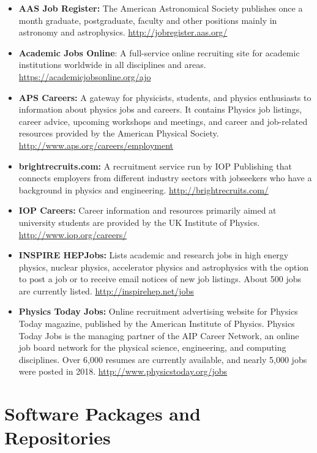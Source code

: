 \begin{itemize}
\item
  \textbf{AAS Job Register:} The American Astronomical Society publishes
  once a month graduate, postgraduate, faculty and other positions
  mainly in astronomy and astrophysics.
  \url{http://jobregister.aas.org/}
\item
  \textbf{Academic Jobs Online}: A full-service online recruiting site
  for academic institutions worldwide in all disciplines and areas.
  \url{https://academicjobsonline.org/ajo}
\item
  \textbf{APS Careers:} A gateway for physicists, students, and physics
  enthusiasts to information about physics jobs and careers. It contains
  Physics job listings, career advice, upcoming workshops and meetings,
  and career and job-related resources provided by the American Physical
  Society. \url{http://www.aps.org/careers/employment}
\item
  \textbf{brightrecruits.com:} A recruitment service run by IOP
  Publishing that connects employers from different industry sectors
  with jobseekers who have a background in physics and engineering.
  \url{http://brightrecruits.com/}
\item
  \textbf{IOP Careers:} Career information and resources primarily aimed
  at university students are provided by the UK Institute of Physics.
  \url{http://www.iop.org/careers/}
\item
  \textbf{INSPIRE HEPJobs:} Lists academic and research jobs in high
  energy physics, nuclear physics, accelerator physics and astrophysics
  with the option to post a job or to receive email notices of new job
  listings. About 500 jobs are currently listed.
  \url{http://inspirehep.net/jobs}
\item
  \textbf{Physics Today Jobs:} Online recruitment advertising website
  for Physics Today magazine, published by the American Institute of
  Physics. Physics Today Jobs is the managing partner of the AIP Career
  Network, an online job board network for the physical science,
  engineering, and computing disciplines. Over 6,000 resumes are
  currently available, and nearly 5,000 jobs were posted in 2018.
  \url{http://www.physicstoday.org/jobs}
\end{itemize}

\section{Software Packages and
Repositories}\label{databases:sec:repositories}

